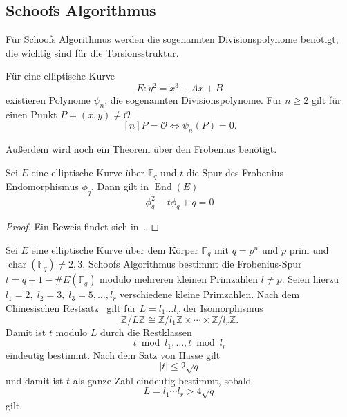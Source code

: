 \subsection{Schoofs Algorithmus}
Für Schoofs Algorithmus werden die sogenannten Divisionspolynome benötigt, die wichtig sind für die Torsionsstruktur.
\begin{definition}[Divisionspolynome]
    Für eine elliptische Kurve
    \[
        E:y^2=x^3+Ax+B
    \]
    existieren Polynome $\psi_n$, die sogenannten
    Divisionspolynome. Für $n\geq2$ gilt für einen Punkt
    $P=(x,y)\neq\mathcal O$
    \[
        [n]P=\mathcal O
        \iff
        \psi_n(P)=0.
    \]
\end{definition}
Außerdem wird noch ein Theorem über den Frobenius benötigt.
\begin{theorem}
    Sei $E$ eine elliptische Kurve über $\mathbb{F}_q$ und $t$ die Spur des Frobenius Endomorphismus $\phi_q$. Dann gilt in
    $\operatorname{End}(E)$
    \[
        \phi_q^2-t\phi_q+q=0
    \]
\end{theorem}

\begin{proof}
    Ein Beweis findet sich in~\cite[Theorem~4.10, S.~101]{washington08}.
\end{proof}
Sei $E$ eine elliptische Kurve über dem Körper $\mathbb{F}_q$ mit $q=p^n$ und $p$ prim und $\operatorname{char}(\mathbb{F}_q)\neq 2,3$.
Schoofs Algorithmus bestimmt die Frobenius-Spur $t=q+1-\#E(\mathbb{F}_q)$ modulo mehreren kleinen Primzahlen $l\neq p$. Seien hierzu \(l_1=2,\; l_2=3,\; l_3=5,\dots,l_r\) verschiedene kleine Primzahlen. Nach dem Chinesischen Restsatz~\cite[S.~115--116, Satz~6.2.1]{werner02} gilt für \(L=l_1\dots l_r\) der Isomorphismus
\[
    \mathbb Z/L\mathbb Z
    \cong
    \mathbb Z/l_1\mathbb Z
    \times\cdots\times
    \mathbb Z/l_r\mathbb Z.
\]
Damit ist $t$ modulo $L$ durch die Restklassen
\[
    t\bmod l_1,\dots,t\bmod l_r
\]
eindeutig bestimmt. Nach dem Satz von Hasse gilt
\[
    |t|\leq 2\sqrt q
\]
und damit ist $t$ als ganze Zahl eindeutig bestimmt, sobald
\[
    L=l_1\cdots l_r>4\sqrt q
\]
gilt.

